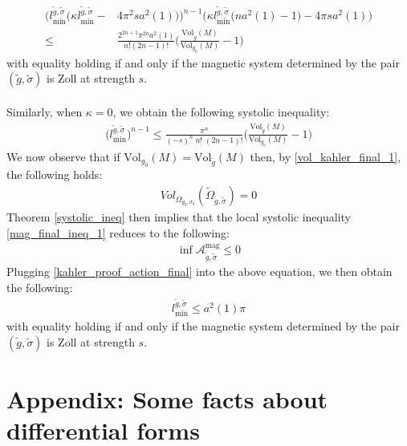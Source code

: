 \documentclass[11pt]{amsart}
\theoremstyle{plain}
\theoremstyle{definition}
\theoremstyle{remark}
\begin{document}
\begin{align}
    \Bigg(
        l_{\text{min}}^{\tilde g,\tilde \sigma}
        \Big(
            \kappa l_{\text{min}}^{\tilde g,\tilde \sigma}
            -&4\pi^2s a^2(1)
        \Big)
    \Bigg)^{n-1}
    \Bigg(
        \kappa l_{\text{min}}^{\tilde g,\tilde \sigma}
        \big(na^2(1)-1\big)
        -4\pi s a^2(1)
    \Bigg) \\\nonumber \leq& \frac{2^{2n+1}\pi^{2n}a^2(1)}{n!(2n-1)!} \Bigg(\frac{\text{Vol}_{\tilde g}(M)}{\text{Vol}_{g_0}(M)}-1\Bigg)
\end{align}
with equality holding if and only if the magnetic system determined by the pair $(\tilde g,\tilde \sigma)$ is Zoll at strength $s$.\\
\\
Similarly, when $\kappa=0$, we obtain the following systolic inequality:
\begin{align}
    \Big(l_{\text{min}}^{\tilde g,\tilde \sigma}\Big)^{n-1} \leq \frac{\pi^n}{(-s)^n\; n!\;(2n-1)! }\Bigg(\frac{\text{Vol}_{\tilde g}(M)}{\text{Vol}_{g_0}(M)}-1\Bigg)
\end{align}
We now observe that if $\text{Vol}_{g_0}(M) = \text{Vol}_{\tilde g}(M)$ then, by \eqref{vol_kahler_final_1}, the following holds:
\begin{align}
    Vol_{\Omega_{g_0,\sigma_0}}(\tilde \Omega_{\tilde g, \tilde \sigma}) =0
\end{align}
Theorem \ref{systolic_ineq} then implies that the local systolic inequality \eqref{mag_final_ineq_1} reduces to the following:
\begin{align}
    \inf \mathcal{A}^{\text{mag}}_{\tilde g,\tilde \sigma} \leq 0
\end{align}
Plugging \eqref{kahler_proof_action_final} into the above equation, we then obtain the following:
\begin{align}
    l_{\text{min}}^{\tilde g,\tilde \sigma} \leq  a^2(1)\pi
\end{align}
with equality holding if and only if the magnetic system determined by the pair $(\tilde g,\tilde \sigma)$ is Zoll at strength $s$.

\section{Appendix: Some facts about differential forms}
\end{document}
